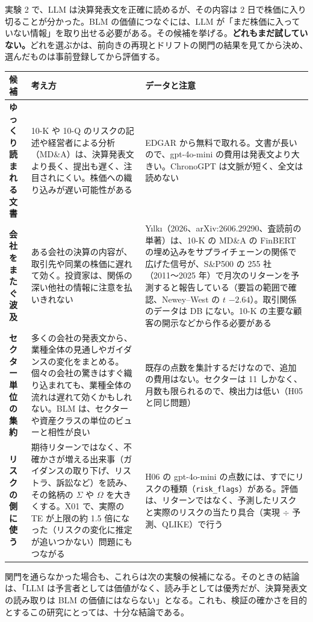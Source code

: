 \documentclass[xelatex,ja=standard,jafont=haranoaji,a4paper,10pt]{bxjsreport}
\newcommand{\SP}{S\&P500}
\newcommand{\code}[1]{\texttt{#1}}
\begin{document}
実験 2 で、LLM は決算発表文を正確に読めるが、その内容は 2 日で株価に入り切ることが分かった。BLM の価値につなぐには、LLM が「まだ株価に入っていない情報」を取り出せる必要がある。その候補を挙げる。\textbf{どれもまだ試していない。}どれを選ぶかは、前向きの再現とドリフトの関門の結果を見てから決め、選んだものは事前登録してから評価する。

\begin{longtable}{p{2.7cm}p{6.0cm}p{5.4cm}}
\toprule
\textbf{候補} & \textbf{考え方} & \textbf{データと注意} \\
\midrule
\endfirsthead
\bottomrule
\endfoot
\textbf{ゆっくり読まれる文書} & 10-K や 10-Q のリスクの記述や経営者による分析（MD\&A）は、決算発表文より長く、提出も遅く、注目されにくい。株価への織り込みが遅い可能性がある & EDGAR から無料で取れる。文書が長いので、gpt-4o-mini の費用は発表文より大きい。ChronoGPT は文脈が短く、全文は読めない \\
\midrule
\textbf{会社をまたぐ波及} & ある会社の決算の内容が、取引先や同業の株価に遅れて効く。投資家は、関係の深い他社の情報に注意を払いきれない & Yılkı（2026、arXiv:2606.29290、査読前の単著）は、10-K の MD\&A の FinBERT の埋め込みをサプライチェーンの関係で広げた信号が、\SP{} の 255 社（2011〜2025 年）で月次のリターンを予測すると報告している（要旨の範囲で確認、Newey--West の $t$ $-2.64$）。取引関係のデータは DB にない。10-K の主要な顧客の開示などから作る必要がある \\
\midrule
\textbf{セクター単位の集約} & 多くの会社の発表文から、業種全体の見通しやガイダンスの変化をまとめる。個々の会社の驚きはすぐ織り込まれても、業種全体の流れは遅れて効くかもしれない。BLM は、セクターや資産クラスの単位のビューと相性が良い & 既存の点数を集計するだけなので、追加の費用はない。セクターは 11 しかなく、月数も限られるので、検出力は低い（H05 と同じ問題） \\
\midrule
\textbf{リスクの側に使う} & 期待リターンではなく、不確かさが増える出来事（ガイダンスの取り下げ、リストラ、訴訟など）を読み、その銘柄の $\Sigma$ や $\Omega$ を大きくする。X01 で、実際の TE が上限の約 1.5 倍になった（リスクの変化に推定が追いつかない）問題にもつながる & H06 の gpt-4o-mini の点数には、すでにリスクの種類（\code{risk\_flags}）がある。評価は、リターンではなく、予測したリスクと実際のリスクの当たり具合（実現 $\div$ 予測、QLIKE）で行う \\
\end{longtable}

関門を通らなかった場合も、これらは次の実験の候補になる。そのときの結論は、「LLM は予言者としては価値がなく、読み手としては優秀だが、決算発表文の読み取りは BLM の価値にはならない」となる。これも、検証の確かさを目的とするこの研究にとっては、十分な結論である。
\end{document}
